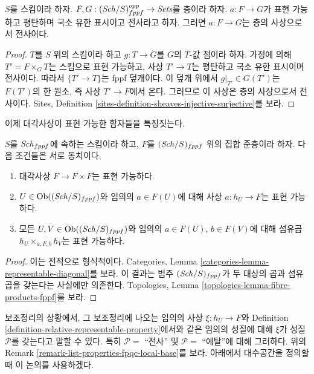 \begin{lemma}
\label{lemma-surjective-flat-locally-finite-presentation}
$S$를 스킴이라 하자.
$F, G : (\mathit{Sch}/S)_{fppf}^{opp} \to \textit{Sets}$를 층이라 하자.
$a : F \to G$가 표현 가능하고 평탄하며 국소 유한 표시이고 전사라고 하자.
그러면 $a : F \to G$는 층의 사상으로서 전사이다.
\end{lemma}

\begin{proof}
$T$를 $S$ 위의 스킴이라 하고 $g : T \to G$를 $G$의 $T$-값 점이라
하자. 가정에 의해 $T' = F \times_G T$는 스킴으로 표현 가능하고,
사상 $T' \to T$는 평탄하고 국소 유한 표시이며 전사이다. 따라서
$\{T' \to T\}$는 fppf 덮개이다. 이 덮개 위에서
$g|_{T'} \in G(T')$는 $F(T')$의 한 원소, 즉 사상 $T' \to F$에서 온다.
그러므로 이 사상은 층의 사상으로서 전사이다. Sites, Definition
\ref{sites-definition-sheaves-injective-surjective}를 보라.
\end{proof}

\noindent
이제 대각사상이 표현 가능한 함자들을 특징짓는다.

\begin{lemma}
\label{lemma-representable-diagonal}
$S$를 $\mathit{Sch}_{fppf}$에 속하는 스킴이라 하고,
$F$를 $(\mathit{Sch}/S)_{fppf}$ 위의 집합 준층이라 하자.
다음 조건들은 서로 동치이다.
\begin{enumerate}
\item 대각사상 $F \to F \times F$는 표현 가능하다.
\item $U \in \mathop{\mathrm{Ob}}\nolimits((\mathit{Sch}/S)_{fppf})$와 임의의 $a \in F(U)$에 대해
사상 $a : h_U \to F$는 표현 가능하다.
\item 모든 $U, V \in \mathop{\mathrm{Ob}}\nolimits((\mathit{Sch}/S)_{fppf})$와 임의의
$a \in F(U)$, $b \in F(V)$에 대해 섬유곱
$h_U \times_{a, F, b} h_V$는 표현 가능하다.
\end{enumerate}
\end{lemma}

\begin{proof}
이는 전적으로 형식적이다. Categories, Lemma
\ref{categories-lemma-representable-diagonal}를 보라. 이 결과는 범주
$(\mathit{Sch}/S)_{fppf}$가 두 대상의 곱과 섬유곱을 갖는다는 사실에만 의존한다.
Topologies, Lemma \ref{topologies-lemma-fibre-products-fppf}를 보라.
\end{proof}

\noindent
보조정리의 상황에서, 그 보조정리에 나오는 임의의 사상
$\xi : h_U \to F$와 Definition
\ref{definition-relative-representable-property}에서와 같은 임의의 성질에
대해 $\xi$가 성질 $\mathcal{P}$를 갖는다고 말할 수 있다.
특히 $\mathcal{P}=$ ``전사'' 및 $\mathcal{P}=$ ``에탈''에 대해 그러하다.
위의 Remark \ref{remark-list-properties-fpqc-local-base}를 보라.
아래에서 대수공간을 정의할 때 이 논의를 사용하겠다.

